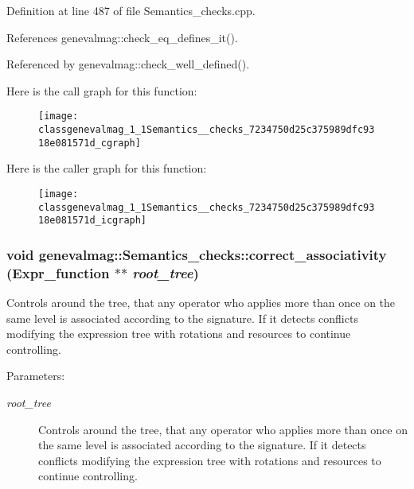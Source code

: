 Definition at line 487 of file Semantics\_\-checks.cpp.

References genevalmag::check\_\-eq\_\-defines\_\-it().

Referenced by genevalmag::check\_\-well\_\-defined().

Here is the call graph for this function:\nopagebreak
\begin{figure}[H]
\begin{center}
\leavevmode
\texttt{[image: classgenevalmag\_1\_1Semantics\_\_checks\_7234750d25c375989dfc9318e081571d\_cgraph]}
\end{center}
\end{figure}


Here is the caller graph for this function:\nopagebreak
\begin{figure}[H]
\begin{center}
\leavevmode
\texttt{[image: classgenevalmag\_1\_1Semantics\_\_checks\_7234750d25c375989dfc9318e081571d\_icgraph]}
\end{center}
\end{figure}
\hypertarget{classgenevalmag_1_1Semantics__checks_7cc9baa891ee17c0e4140014597c49d8}{
\subsubsection[{correct\_\-associativity}]{\setlength{\rightskip}{0pt plus 5cm}void genevalmag::Semantics\_\-checks::correct\_\-associativity ({\bf Expr\_\-function} $\ast$$\ast$ {\em root\_\-tree})}}
\label{classgenevalmag_1_1Semantics__checks_7cc9baa891ee17c0e4140014597c49d8}


Controls around the tree, that any operator who applies more than once on the same level is associated according to the signature. If it detects conflicts modifying the expression tree with rotations and resources to continue controlling.

\begin{Desc}
\item[Parameters:]
\begin{description}
\item[{\em root\_\-tree}]Controls around the tree, that any operator who applies more than once on the same level is associated according to the signature. If it detects conflicts modifying the expression tree with rotations and resources to continue controlling. \end{description}
\end{Desc}


